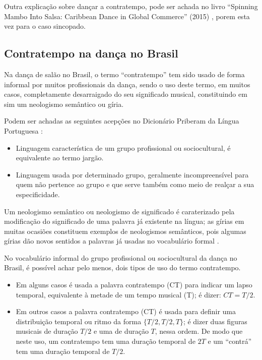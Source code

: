 Outra explicação sobre dançar a contratempo, pode ser achada
no livro ``Spinning Mambo Into Salsa: Caribbean Dance in Global Commerce'' (2015) \cite[pp. 68]{mcmains2015spinning},
porem esta vez para o caso sincopado. 


\subsection{Contratempo na dança no Brasil}
\label{subsec:contratempobrasil}
Na dança de salão no Brasil, 
o termo ``contratempo'' tem sido usado de forma informal por muitos profissionais da dança,
sendo o uso deste termo, em muitos casos, completamente desarraigado do seu significado musical,
constituindo em sim um neologismo semântico ou gíria.

\begin{definition}[Gíria:] 
\label{def:Giria}
Podem ser achadas as seguintes acepções no Dicionário Priberam da Língua Portuguesa \cite{priberamgiria}:
\begin{itemize}
\item Linguagem característica de um grupo profissional ou sociocultural, é equivalente ao termo jargão.
\item Linguagem usada por determinado grupo, 
geralmente incompreensível para quem não pertence ao grupo e que serve também como meio de realçar a sua especificidade.
\end{itemize}
\end{definition}

\begin{definition} 
\label{def:NeologismoSemantico}
Um neologismo semântico ou neologismo de significado é caraterizado pela modificação 
do significado de uma palavra já existente na língua;
as gírias em muitas ocasiões constituem exemplos de neologismos semânticos, 
pois algumas gírias dão novos sentidos a palavras já usadas no vocabulário formal \cite[pp. 82-83]{correalingua}.
\end{definition}

No vocabulário informal do grupo profissional ou sociocultural da dança no Brasil,
é possível achar pelo menos, dois tipos de uso do termo contratempo.
\begin{itemize}
\item Em alguns casos é usada a palavra contratempo (CT) para indicar um lapso temporal, 
equivalente à metade de um tempo musical (T); é dizer: $CT=T/2$.
\item Em outros casos a palavra contratempo (CT) é usada para definir uma distribuição temporal 
ou ritmo da forma $\{T/2, T/2, T\}$; é dizer duas figuras musicais de duração $T/2$ e uma de duração $T$,
nessa ordem. De modo que neste uso, um contratempo tem uma duração temporal de $2T$
e um ``contrá'' tem uma duração temporal de $T/2$. 
\end{itemize}

